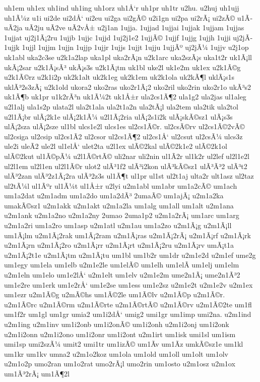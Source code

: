 {uh1em
uh1ex
uh1ind
uh1ing
uh1orz
uh1Å‘r
uh1pr
uh1tr
u2hu.
u2huj
uh1ujj
uh1Ã¼z
u1i
ui2de
ui2dÅ‘
ui2eu
ui2ga
ui2gÃ©
u2i1gn
ui2pa
ui2rÃ¡
ui2zÃ©
u1Ã­
uÃ­2ja
uÃ­2ju
uÃ­2ve
uÃ­2vÅ±
u2j1an
1ujja.
1ujjad
1ujjai
1ujjak
1ujjam
1ujjas
1ujjat
uj2j1Ã¡2ru
1ujjb
1ujjc
1ujjd
1uj2j1e2
1ujjÃ©
1ujjf
1ujjg
1ujjh
1ujji
uj2jÃ­
1ujjk
1ujjl
1ujjm
1ujjn
1ujjp
1ujjr
1ujjs
1ujjt
1ujju
1ujjÃº
uj2jÃ¼
1ujjv
u2j1op
uk1abl
uka2c3se
u2k1a2lap
uka1pl
uka2rÃ¡n
u2k1arc
uka2szÃ¡s
uka1t2r
uk1Ã¡ll
ukÃ¡2sar
u2k1Ã¡sÃ³
ukÃ¡s3s
u2k1Ã¡tm
uk1bl
uke2l
uk1e2m
uk1ex
u2k1Ã©g
u2k1Ã©rz
u2k1i2p
uk2k1alt
uk2k1eg
uk2k1em
uk2k1ola
uk2kÃ¶l
uklÃ¡s1s
uklÃ³2s3zÃ¡
u2k1old
ukora2
uko2ras
uko2r1Ã¡2
uko2ril
uko2rin
uko2r1o
ukÃ³s2
uk1Ã¶b
uk1pr
u1k2rÃ³n
uk1Ã¼2t
uk1Å±r
ula2cs1Ã¶2
ula1g2
ula2jas
ul1aleg
u2l1alj
ula1s2p
ulata2l
ula2t1ala
ula2t1a2n
ula2tÃ¡l
ula2tem
ula2tik
ula2tol
u2l1Ã¡br
ulÃ¡2k1e
ulÃ¡2k1Ã¼
u2l1Ã¡2ria
ulÃ¡2s1i2k
ulÃ¡skÃ©sz1
ulÃ¡s3s
ulÃ¡2sza
ulÃ¡2sze
ul1bl
ulcs1e2l
ulcs1es
ul2cs1Ã©r.
ul2csÃ©rv
ul2cs1Ã©2vÃ©
ul2csiga
ul2csip
ul2cs1Ã­2
ul2csor
ul2cs1Ã¶2
ul2cs1Å‘
ul2csut
ul2csÃ¼
ulcs3z
ule2i
uleÃ­2
ule2l
ul1elÅ‘
ulet2ta
u2l1ex
ulÃ©2kal
ulÃ©2k1e2
ulÃ©2k1ol
ulÃ©2kut
ul1Ã©pÃ¼
u2l1Ã©rtÃ©
uli2nar
uli2nin
ul1Ã­2r
ul1k2r
ul2lef
ul2l1e2l
ul2l1em
ul2l1en
ul2l1Ã©r
ulot2
ulÃ³1f2
ulÃ³i2kon
ulÃ³kÃ©sz1
ulÃ³Ã³2
ulÃ³t2
ulÃ³2zan
ulÃ³2z1Ã¡2ra
ulÃ³2z3s
ul1Ã¶t
ul1pr
ul1st
ul2t1aj
ulta2r
ult1asz
ul2taz
ul2tÃ¼l
ul1Ãºr
ul1Ã¼t
ul1Å±r
u2lyi
u2m1abl
um1abr
um1a2cÃ©
um1ach
um1a2dat
u2m1adm
um1a2do
um1a2dÃ³
2umaÃ©
um1ajÃ¡
u2m1a2ka
umakÃ©sz1
u2m1akk
u2m1akt
u2m1a2la
um1alg
um1all
um1alt
u2m1ana
u2m1ank
u2m1a2no
u2m1a2ny
2umao
2uma1p2
u2m1a2rÃ¡
um1arc
um1arg
u2m1a2ri
um1a2ro
um1asp
u2m1atl
u2m1au
um1a2zo
u2m1Ã¡g
u2m1Ã¡ll
um1Ã¡lm
u2m1Ã¡2rak
um1Ã¡2ram
u2m1Ã¡ras
u2m1Ã¡2rÃ¡
u2m1Ã¡rf
u2m1Ã¡rk
u2m1Ã¡rn
u2m1Ã¡2ro
u2m1Ã¡rr
u2m1Ã¡rt
u2m1Ã¡2ru
u2m1Ã¡rv
umÃ¡t1a
u2m1Ã¡2t1e
u2m1Ã¡tm
u2m1Ã¡tu
um1bl
um1b2r
um1dr
u2m1e2d
u2m1ef
ume2g
um1egy
um1ela
um1elb
u2m1e2le
um1elÃ©
um1elh
um1elÃ­
um1elj
um1elm
u2m1eln
um1elo
um1e2lÅ‘
u2m1elt
um1elv
u2m1e2m
ume2n1Ã¡
ume2n1Ã³2
um1e2re
um1erk
um1e2rÅ‘
um1e2se
um1ess
um1e2sz
u2m1e2t
u2m1e2v
u2m1ex
um1ezr
u2m1Ã©g
u2mÃ©hs
um1Ã©2le
um1Ã©lv
u2m1Ã©p
u2m1Ã©r.
u2m1Ã©rc
u2m1Ã©rm
u2m1Ã©rte
u2m1Ã©rtÃ©
u2m1Ã©rv
u2m1Ã©2te
um1fl
um1f2r
um1gl
um1gr
umia2
um1i2dÅ‘
umig2
umi1gr
um1imp
umi2na.
u2m1ind
u2m1ing
u2m1inv
um1i2onb
um1i2onÃ©
um1i2onh
u2m1i2onj
um1i2onk
u2m1i2onn
u2m1i2ono
um1i2onr
um1i2ont
u2m1irt
um1isk
umi1sl
um1ism
umi1sp
umi2szÃ¼
umit2
umi1tr
um1izÃ©
um1Ã­v
um1Ã­z
umkÃ©sz1e
um1kl
um1kr
um1kv
umna2
u2m1o2koz
um1ola
um1old
um1oll
um1olt
um1olv
u2m1o2p
umo2ran
um1o2rat
umo2rÃ¡l
umo2rin
um1osto
u2m1osz
u2m1ox
um1Ã³2rÃ¡
um1Ã¶2l
}
